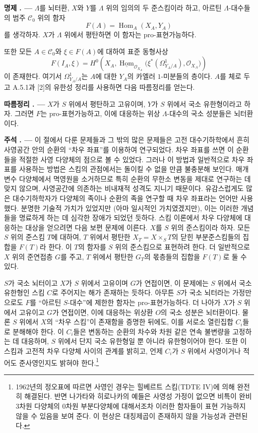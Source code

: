\documentclass[11pt,twoside,openany]{book}
\numberwithin{equation}{section}
\newcommand{\sourceunit}{front}
\newcommand{\src}[1]{%
  \phantomsection\hypertarget{src:\sourceunit:#1}{}%
  \marginpar{\raggedleft\footnotesize\sffamily #1}%
}
\theoremstyle{plain}
\theoremstyle{definition}
\theoremstyle{remark}
\newcommand{\result}[2]{%
  \par\medskip\noindent\textbf{#1%
  \if\relax\detokenize{#2}\relax\else\space#2\fi. ---}\enspace
}
\begin{document}
\src{382}
\result{명제}{2.1} $\Lambda$를 뇌터환, $X$와 $Y$를 $\Lambda$ 위의
임의의 두 준스킴이라 하고, 아르틴 $\Lambda$-대수들의 범주
$\mathcal C_0$ 위의 함자
\[
  F(A)=\operatorname{Hom}_A(X_A,Y_A)
\]
를 생각하자. $X$가 $\Lambda$ 위에서 평탄하면 이 함자는
pro-표현가능하다.

또한 모든 $A\in\mathcal C_0$와 $\xi\in F(A)$에 대하여 표준 동형사상
\[
  F(I_A,\xi)=H^0\!\left(
    X_A,
    \underline{\operatorname{Hom}}_{\mathcal O_{X_A}}
    \bigl(\xi^*(\Omega^1_{Y_A/A}),\mathcal O_{X_A}\bigr)
  \right)
\]
이 존재한다. 여기서 $\Omega^1_{Y_A/A}$는 $A$에 대한 $Y_A$의 카엘러
$1$-미분들의 층이다. $A$를 체로 두고 A.5.1과 [2]의 유한성 정리를
사용하면 다음 따름정리를 얻는다.

\result{따름정리}{} $X$가 $S$ 위에서 평탄하고 고유이며, $Y$가 $S$
위에서 국소 유한형이라고 하자. 그러면 $F$는 pro-표현가능하고, 이에
대응하는 위상 $\Lambda$-대수의 국소 성분들은 뇌터환이다.

\result{주석}{} 이 절에서 다룬 문제들과 그 밖의 많은 문제들은 고전
대수기하학에서 흔히 사영공간 안의 순환의 ``차우 좌표''를 이용하여
연구되었다. 차우 좌표를 쓰면 이 순환들을 적절한 사영 다양체의 점으로
볼 수 있었다. 그러나 이 방법과 일반적으로 차우 좌표를 사용하는 방법은
스킴의 관점에서는 돌이킬 수 없을 만큼 불충분해 보인다. 매개변수
다양체에서 멱영원을 소거하므로 특히 순환의 무한소 변동을 제대로
연구하는 데 맞지 않으며, 사영공간에 의존하는 비내재적 성격도 지니기
때문이다. 유감스럽게도 많은 대수기하학자가 다양체의 족이나 순환의 족을
연구할 때 차우 좌표라는 언어만 사용했다. 분명한 기술적 가치가 있었지만
(아마 일시적인 가치였겠지만), 이는 이러한 개념들을 명료하게 하는 데
심각한 장애가 되었던 듯하다. 스킴 이론에서 차우 다양체에 대응하는
대상을 얻으려면 다음 보편 문제에 이른다. $X$를 $S$ 위의 준스킴이라
하자. 모든 $S$ 위의 준스킴 $T$에 대하여, $T$ 위에서 평탄한
$X_T=X\times_ST$의 닫힌 부분준스킴들의 집합을 $F(T)$라 한다. 이
$T$의 함자를 $S$ 위의 준스킴으로 표현하려 한다. 더 일반적으로 $X$ 위의
준연접층 $G$를 주고, $T$ 위에서 평탄한 $G_T$의 몫층들의 집합을
$F(T)$로 둘 수 있다.

\src{383}
$S$가 국소 뇌터이고 $X$가 $S$ 위에서 고유이며 $G$가 연접이면, 이
문제에는 $S$ 위에서 국소 유한형인 스킴 $C$로 주어지는 해가 존재하는
듯하다. 아무튼 $S$가 국소 뇌터라는 가정만으로도 $F$를 ``아르틴
$S$-대수''에 제한한 함자는 pro-표현가능하다. 더 나아가 $X$가 $S$
위에서 고유이고 $G$가 연접이면, 이에 대응하는 위상환 $O$의 국소 성분은
뇌터환이다. 물론 $S$ 위에서 $X$의 ``차우 스킴''이 존재함을 증명한
뒤에도, 이를 서로소 열린집합 $C_i$들로 분해해야 한다. 이 $C_i$들은
변동하는 순환의 차수와 차원 같은 연속 불변량을 고정하는 데 대응하며,
$S$ 위에서 단지 국소 유한형일 뿐 아니라 유한형이어야 한다. 또한 이
스킴과 고전적 차우 다양체 사이의 관계를 밝히고, 언제 $C_i$가 $S$ 위에서
사영이거나 적어도 준사영인지도 밝혀야 한다.\footnote{1962년의 정오표에
따르면 사영인 경우는 힐베르트 스킴(TDTE IV)에 의해 완전히 해결된다.
반면 나가타와 히로나카의 예들은 사영성 가정이 없으면 비특이 완비
3차원 다양체의 0차원 부분다양체에 대해서조차 이러한 함자들이 표현
가능하지 않을 수 있음을 보여 준다. 이 현상은 대칭제곱이 존재하지 않을
가능성과 관련된다.}
\end{document}
